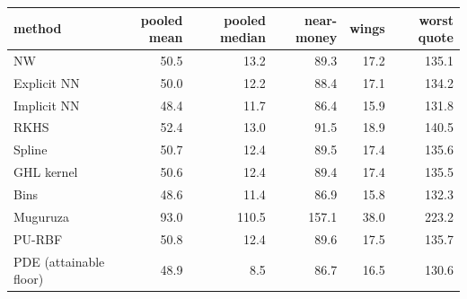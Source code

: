 \begin{tabular}{l rrrrr}
\toprule
method & pooled mean & pooled median & near-money & wings & worst quote\\
\midrule
NW & 50.5 & 13.2 & 89.3 & 17.2 & 135.1\\
Explicit NN & 50.0 & 12.2 & 88.4 & 17.1 & 134.2\\
Implicit NN & 48.4 & 11.7 & 86.4 & 15.9 & 131.8\\
RKHS & 52.4 & 13.0 & 91.5 & 18.9 & 140.5\\
Spline & 50.7 & 12.4 & 89.5 & 17.4 & 135.6\\
GHL kernel & 50.6 & 12.4 & 89.4 & 17.4 & 135.5\\
Bins & 48.6 & 11.4 & 86.9 & 15.8 & 132.3\\
Muguruza & 93.0 & 110.5 & 157.1 & 38.0 & 223.2\\
PU-RBF & 50.8 & 12.4 & 89.6 & 17.5 & 135.7\\
PDE (attainable floor) & 48.9 & 8.5 & 86.7 & 16.5 & 130.6\\
\bottomrule
\end{tabular}
